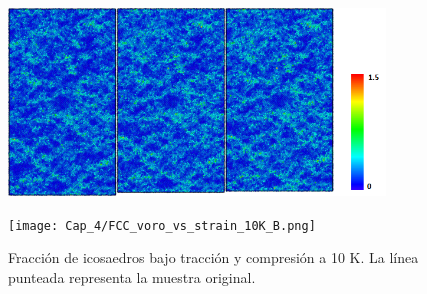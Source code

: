 
\begin{figure}[htp]
\centering
\includegraphics[width=10cm]{../ResumenImagenes/Figures/NanoParticles/Snapshots/B2SphereCompression_400K_Snapshots.png}
\caption[Inclusión de CuZr-B2 bajo compresión a 400K]{}
\label{C4:fg:snapshot_comp_B2_400K}
\end{figure}

\begin{figure}[htp]
\centering
\texttt{[image: Cap\_4/FCC\_voro\_vs\_strain\_10K\_B.png]}
\caption[Fracción de icosaedros a 10K]{Fracción de icosaedros bajo tracción y compresión a 10 K. La línea punteada representa la muestra original.}
\label{C4:fg:fcc_voro_10K}
\end{figure}

